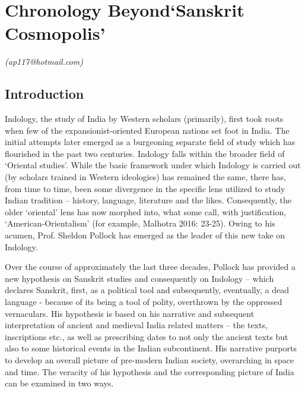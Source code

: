 
\chapter{\hspace{4.5cm} Chronology Beyond\hfill\break ‘Sanskrit Cosmopolis’}\label{chapter7}



\begin{flushright}
\textit{(ap117@hotmail.com)}
\end{flushright}

\setcounter{endnote}{0}

\section*{Introduction}

Indology, the study of India by Western scholars (primarily), first took roots when few of the expansionist-oriented European nations set foot in India. The initial attempts later emerged as a burgeoning separate field of study which has flourished in the past two centuries. Indology falls within the broader field of ‘Oriental studies’. While the basic framework under which Indology is carried out (by scholars trained in Western ideologies) has remained the same, there has, from time to time, been some divergence in the specific lens utilized to study Indian tradition – history, language, literature and the likes. Consequently, the older ‘oriental’ lens has now morphed into, what some call, with justification, ‘American-Orientalism’ (for example, Malhotra 2016: 23-25). Owing to his acumen, Prof. Sheldon Pollock has emerged as the leader of this new take on Indology.

Over the course of approximately the last three decades, Pollock has provided a new hypothesis on Sanskrit studies and consequently on Indology -- which declares Sanskrit, first, as a political tool and subsequently, eventually, a dead language - because of its being a tool of polity, overthrown by the oppressed vernaculars. His hypothesis is based on his narrative and subsequent interpretation of ancient and medieval India related matters – the texts, inscriptions etc., as well as prescribing dates to not only the ancient texts but also to some historical events in the Indian subcontinent. His narrative purports to develop an overall picture of pre-modern Indian society, overarching in space and time. The veracity of his hypothesis and the corresponding picture of India can be examined in two ways.

